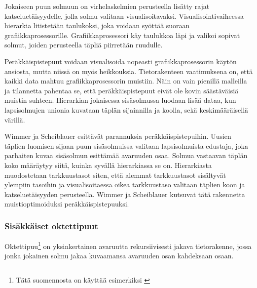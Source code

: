 Jokaiseen puun solmuun on virhelaskelmien perusteella lisätty rajat katseluetäisyydelle, jolla solmu valitaan visualisoitavaksi. Visualisointivaiheessa hierarkia litistetään taulukoksi, joka voidaan syöttää suoraan grafiikkaprosessorille. Grafiikkaprosessori käy taulukkoa läpi ja valikoi sopivat solmut, joiden perusteella täpliä piirretään ruudulle. \cite{spt}

Peräkkäispistepuut voidaan visualisoida nopeasti grafiikkaprosessorin käytön ansiosta, mutta niissä on myös heikkouksia. Tietorakenteen vaatimuksena on, että kaikki data mahtuu grafiikkaprosessorin muistiin. Näin on vain pienillä malleilla ja tilannetta pahentaa se, että peräkkäispistepuut eivät ole kovin säästäväisiä muistin suhteen. Hierarkian jokaisessa sisäsolmussa luodaan lisää dataa, kun lapsisolmujen unionia kuvataan täplän sijainnilla ja koolla, sekä keskimääräisellä värillä.

Wimmer ja Scheiblauer esittävät parannuksia peräkkäispistepuihin. Uusien täplien luomisen sijaan puun sisäsolmuissa valitaan lapsisolmuista edustaja, joka parhaiten kuvaa sisäsolmun esittämää avaruuden osaa. Solmua vastaavan täplän koko määräytyy siitä, kuinka syvällä hierarkiassa se on. Hierarkiasta muodostetaan tarkkuustasot siten, että alemmat tarkkuustasot sisältyvät ylempiin tasoihin ja visualisoitaessa oikea tarkkuustaso valitaan täplien koon ja katseluetäisyyden perusteella. Wimmer ja Scheiblauer kutsuvat tätä rakennetta muistioptimoiduksi peräkkäispistepuuksi.  \cite{ip} %


\subsubsection{Sisäkkäiset oktettipuut}
Oktettipuu\footnote{Tätä suomennosta on käyttää esimerkiksi \cite{oktettipuu}}  on yksinkertainen avaruutta rekursiivisesti jakava tietorakenne, jossa jonka jokainen solmu jakaa kuvaamansa avaruuden osan kahdeksaan osaan.
